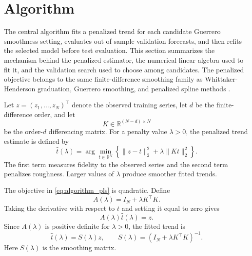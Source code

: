 \section{Algorithm}
The central algorithm fits a penalized trend for each candidate Guerrero
smoothness setting, evaluates out-of-sample validation forecasts, and then
refits the selected model before test evaluation. This section summarizes the
mechanism behind the penalized estimator, the numerical linear algebra used to
fit it, and the validation search used to choose among candidates. The
penalized objective belongs to the same finite-difference smoothing family as
Whittaker-Henderson graduation, Guerrero smoothing, and penalized spline
methods \citep{whittaker1922graduation,henderson1924graduation,
guerrero2007penalized,eilers1996psplines,eilers2003perfect,wahba1990splines}.

Let \(z=(z_1,\ldots,z_N)^\top\) denote the observed training series, let \(d\)
be the finite-difference order, and let
\[
  K \in \mathbb{R}^{(N-d)\times N}
\]
be the order-\(d\) differencing matrix. For a penalty value \(\lambda > 0\),
the penalized trend estimate is defined by
\begin{equation}
\label{eq:algorithm_pls}
  \hat{t}(\lambda)
  =
  \arg\min_{t\in\mathbb{R}^N}
  \left\{
    \|z-t\|_2^2 + \lambda \|K t\|_2^2
  \right\}.
\end{equation}
The first term measures fidelity to the observed series and the second term
penalizes roughness. Larger values of \(\lambda\) produce smoother fitted
trends.

The objective in \eqref{eq:algorithm_pls} is quadratic. Define
\[
  A(\lambda) = I_N + \lambda K^\top K.
\]
Taking the derivative with respect to \(t\) and setting it equal to zero gives
\[
  A(\lambda)\hat{t}(\lambda)=z.
\]
Since \(A(\lambda)\) is positive definite for \(\lambda>0\), the fitted trend is
\begin{equation}
\label{eq:algorithm_smoother}
  \hat{t}(\lambda)
  =
  S(\lambda)z,
  \qquad
  S(\lambda)=\left(I_N+\lambda K^\top K\right)^{-1}.
\end{equation}
Here \(S(\lambda)\) is the smoothing matrix.

